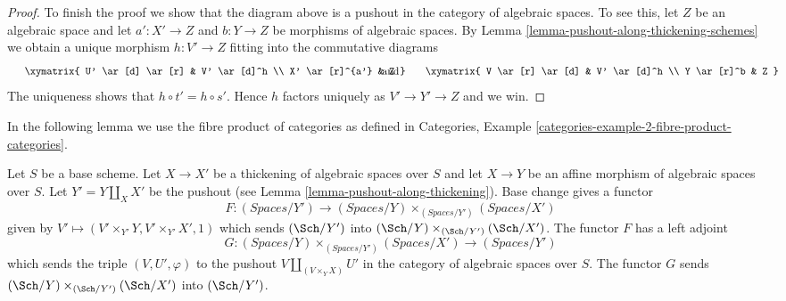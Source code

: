 \begin{proof}
\medskip\noindent
To finish the proof we show that the diagram above is a pushout in
the category of algebraic spaces. To see this, let $Z$ be an algebraic
space and let $a' : X' \to Z$ and $b : Y \to Z$ be morphisms of
algebraic spaces. By
Lemma \ref{lemma-pushout-along-thickening-schemes}
we obtain a unique morphism $h : V' \to Z$ fitting into the commutative
diagrams
$$
\vcenter{
\xymatrix{
U' \ar[d] \ar[r] & V' \ar[d]^h \\
X' \ar[r]^{a'} & Z
}
}
\quad\text{and}\quad
\vcenter{
\xymatrix{
V \ar[r] \ar[d] & V' \ar[d]^h \\
Y \ar[r]^b & Z
}
}
$$
The uniqueness shows that $h \circ t' = h \circ s'$. Hence $h$ factors
uniquely as $V' \to Y' \to Z$ and we win.
\end{proof}

\noindent
In the following lemma we use the fibre product of categories as
defined in
Categories, Example \ref{categories-example-2-fibre-product-categories}.

\begin{lemma}
\label{lemma-categories-spaces-over-pushout}
Let $S$ be a base scheme. Let $X \to X'$ be a thickening of algebraic spaces
over $S$ and let $X \to Y$ be an affine morphism of algebraic spaces over $S$.
Let $Y' = Y \amalg_X X'$ be the pushout (see
Lemma \ref{lemma-pushout-along-thickening}). Base change gives a functor
$$
F :
(\textit{Spaces}/Y')
\longrightarrow
(\textit{Spaces}/Y) \times_{(\textit{Spaces}/Y')} (\textit{Spaces}/X')
$$
given by $V' \longmapsto (V' \times_{Y'} Y, V' \times_{Y'} X', 1)$ which
sends $(\Sch/Y')$ into $(\Sch/Y) \times_{(\Sch/Y')} (\Sch/X')$.
The functor $F$ has a left adjoint
$$
G :
(\textit{Spaces}/Y) \times_{(\textit{Spaces}/Y')} (\textit{Spaces}/X')
\longrightarrow
(\textit{Spaces}/Y')
$$
which sends the triple $(V, U', \varphi)$ to the pushout
$V \amalg_{(V \times_Y X)} U'$ in the category of algebraic spaces over $S$.
The functor $G$ sends $(\Sch/Y) \times_{(\Sch/Y')} (\Sch/X')$ into $(\Sch/Y')$.
\end{lemma}

